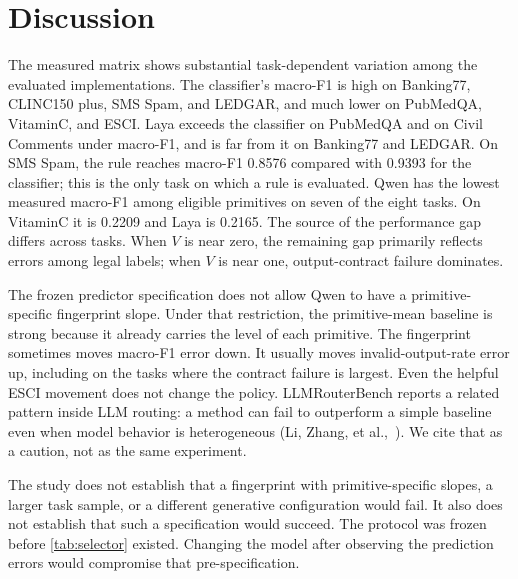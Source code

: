 \section{Discussion}
\label{sec:discussion}

The measured matrix shows substantial task-dependent variation among the evaluated implementations. The classifier's macro-F1 is high on Banking77, CLINC150 plus, SMS Spam, and LEDGAR, and much lower on PubMedQA, VitaminC, and ESCI. Laya exceeds the classifier on PubMedQA and on Civil Comments under macro-F1, and is far from it on Banking77 and LEDGAR. On SMS Spam, the rule reaches macro-F1 0.8576 compared with 0.9393 for the classifier; this is the only task on which a rule is evaluated. Qwen has the lowest measured macro-F1 among eligible primitives on seven of the eight tasks. On VitaminC it is 0.2209 and Laya is 0.2165. The source of the performance gap differs across tasks. When \(V\) is near zero, the remaining gap primarily reflects errors among legal labels; when \(V\) is near one, output-contract failure dominates.

The frozen predictor specification does not allow Qwen to have a primitive-specific fingerprint slope. Under that restriction, the primitive-mean baseline is strong because it already carries the level of each primitive. The fingerprint sometimes moves macro-F1 error down. It usually moves invalid-output-rate error up, including on the tasks where the contract failure is largest. Even the helpful ESCI movement does not change the policy. LLMRouterBench reports a related pattern inside LLM routing: a method can fail to outperform a simple baseline even when model behavior is heterogeneous (Li, Zhang, et al.,~\citeyear{li2026llmrouterbench}). We cite that as a caution, not as the same experiment.

The study does not establish that a fingerprint with primitive-specific slopes, a larger task sample, or a different generative configuration would fail. It also does not establish that such a specification would succeed. The protocol was frozen before \cref{tab:selector} existed. Changing the model after observing the prediction errors would compromise that pre-specification.
